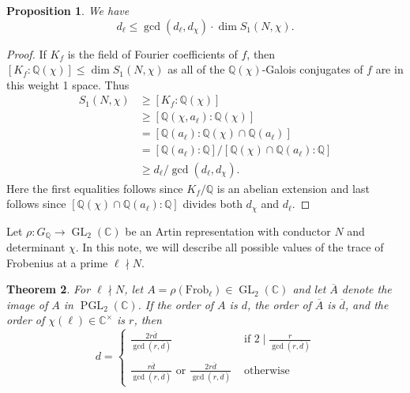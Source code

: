 \documentclass[11pt]{amsart}
\theoremstyle{plain}
\newtheorem{thm}{Theorem}[section]
\newtheorem{prop}[thm]{Proposition}
\theoremstyle{definition}
\newcommand{\Q}{{\mathbb Q}}
\newcommand{\C}{{\mathbb C}}
\DeclareMathOperator{\PGL}{PGL}
\DeclareMathOperator{\GL}{GL}
\newcommand{\Frob}{\text{Frob}}
\renewcommand{\[}{\left[}
\renewcommand{\]}{\right]}
\newcommand{\dbar}{\overline{d}}
\begin{document}
\begin{prop}
We have
$$
d_\ell \leq \gcd(d_\ell,d_\chi) \cdot \dim S_1(N,\chi).
$$
\end{prop}

\begin{proof}
If $K_f$ is the field of Fourier coefficients of $f$, then $[K_f:\Q(\chi)] \leq \dim S_1(N,\chi)$ as all of the $\Q(\chi)$-Galois conjugates of $f$ are in this weight 1 space.  Thus
\begin{align*}
S_1(N,\chi) 
&\geq [K_f:\Q(\chi)] \\
&\geq [\Q(\chi,a_\ell):\Q(\chi)] \\
&= [\Q(a_\ell):\Q(\chi) \cap \Q(a_\ell)] \\
&= [\Q(a_\ell):\Q] / [\Q(\chi) \cap \Q(a_\ell):\Q] \\
&\geq d_\ell / \gcd(d_\ell, d_\chi).
\end{align*}
Here the first equalities follows since $K_f/\Q$ is an abelian extension and last follows since $[\Q(\chi) \cap \Q(a_\ell):\Q]$ divides both $d_\chi$ and $d_\ell$.
\end{proof}
\vfill
\pagebreak
Let $\rho : G_{\Q} \to \GL_2(\C)$ be an Artin representation with conductor $N$ and determinant $\chi$.  In this note, we will describe all possible values of the trace of Frobenius at a prime $\ell \nmid N$.  

\begin{thm}
For $\ell \nmid N$, let $A = \rho(\Frob_\ell) \in \GL_2(\C)$ and let $\overline{A}$ denote the image of $A$ in $\PGL_2(\C)$.  If the order of $A$ is $d$, the order of $\overline{A}$ is $\overline{d}$, and the order of $\chi(\ell) \in \C^\times$ is $r$, then 
$$
d = \begin{cases}
\frac{2 r \dbar}{\gcd(r,\dbar)} & \text{~if~} 2 \mid \frac{r}{\gcd(r,\dbar)} \\ 
~\\
\frac{r \dbar}{\gcd(r,\dbar)} \text{~or~} \frac{2 r \dbar}{\gcd(r,\dbar)} & \text{~otherwise}
\end{cases}
$$
\end{thm}
\end{document}
